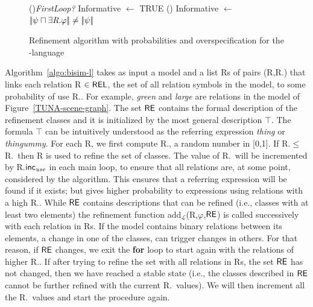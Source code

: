 \begin{figure}[!t]
\begin{algorithm}[H]
\If(){\em FirstLoop?}{
    Informative $\leftarrow$ TRUE }
\lElse() {Informative $\leftarrow$ $|\!|\psi \sqcap \exists \mbox{\em R}.\varphi|\!| \neq |\!|\psi|\!|$} 
\end{algorithm}
\vspace*{-.5cm}\caption{Refinement algorithm with probabilities and overspecification for the \el-language}\label{fig:algo3}

\end{figure}

Algorithm~\ref{algo:bisim-l} takes as input a model and a list Rs of pairs (R,R.\puse) that links each relation R $\in \textsf{REL}$, the set of all relation symbols in the model,  to some probability of use R.\puse. For example, \emph{green} and \emph{large} are relations in the model of Figure~\ref{TUNA-scene-graph}.  
%
The set $\textsf{RE}$ contains the formal description of the refinement classes and it is initialized by the most general description $\top$. The formula $\top$ can be intuitively understood as the referring expression \emph{thing} or \emph{thingummy}.  
For each R, we first compute R.\randomuse, a random number in [0,1].  If R.\randomuse $\le$ R.\puse\ then R is used to refine the set of classes.  The value of R.\puse\ will be incremented by R.$\textsf{inc}_\emph{use}$ in each main loop, to ensure that all relations are, at some point, considered by the algorithm.  This ensures that a referring expression will be found if it exists; but gives higher probability to expressions using relations with a high R.\puse. 
While $\textsf{RE}$ contains descriptions that can be refined (i.e., classes with at least two elements) the refinement function add$_\mathcal{L}$(R,$\varphi$,$\textsf{RE}$) is called successively with each relation in Rs. If the model contains binary relations between its elements, a change in one of the classes, can trigger changes in others. For that reason, if $\textsf{RE}$ changes, we exit the \textbf{for} loop to start again with the relations of higher R.\puse. If after trying to refine the set with all relations in Rs, the set $\textsf{RE}$ has not changed, then we have reached a stable state (i.e., the classes described in $\textsf{RE}$ cannot be further refined with the current R.\puse\ values). We will then increment all the R.\puse\ values and start the procedure again. 


